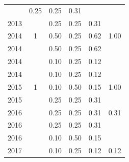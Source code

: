 \begin{table}[H]
\begin{tabular}{| l | c | c | c | c | c |}
          &
          0.25
          &
          0.25
          &
          0.31
          &
          \\
            2013
          &
          
          &
          0.25
          &
          0.25
          &
          0.31
          &
          \\
\hline
            2014
          &
          1
          &
          0.50
          &
          0.25
          &
          0.62
          &
            {\color{blue} 1.00}
          \\
            2014
          &
          
          &
          0.50
          &
          0.25
          &
          0.62
          &
          \\
            2014
          &
          
          &
          0.10
          &
          0.25
          &
          0.12
          &
          \\
            2014
          &
          
          &
          0.10
          &
          0.25
          &
          0.12
          &
          \\
\hline
            2015
          &
          1
          &
          0.10
          &
          0.50
          &
          0.15
          &
            {\color{blue} 1.00}
          \\
            2015
          &
          
          &
          0.25
          &
          0.25
          &
          0.31
          &
          \\
\hline
            2016
          &
          
          &
          0.25
          &
          0.25
          &
          0.31
          &
            {\color{red} 0.31}
          \\
            2016
          &
          
          &
          0.25
          &
          0.25
          &
          0.31
          &
          \\
            2016
          &
          
          &
          0.10
          &
          0.50
          &
          0.15
          &
          \\
\hline
            2017
          &
          
          &
          0.10
          &
          0.25
          &
          0.12
          &
            {\color{red} 0.12}
          \\
\hline
\end{tabular}
\end{table}

